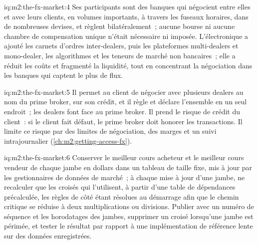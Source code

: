 \begin{solution}{iq:m2:the-fx-market:4}
Ses participants sont des banques qui négocient entre elles et avec leurs clients, en
volumes importants, à travers les fuseaux horaires, dans de nombreuses devises, et règlent
bilatéralement~; aucune bourse ni aucune chambre de compensation unique n'était nécessaire ni imposée. L'électronique
a ajouté les carnets d'ordres inter-dealers, puis les plateformes multi-dealers et mono-dealer,
les algorithmes et les teneurs de marché non bancaires~; elle a réduit les coûts et fragmenté
la liquidité, tout en concentrant la négociation dans les banques qui captent le plus de flux.
\end{solution}

\begin{solution}{iq:m2:the-fx-market:5}
Il permet au client de négocier avec plusieurs dealers au nom du prime broker, sur son crédit,
et il règle et déclare l'ensemble en un seul endroit~; les dealers font face au
prime broker. Il prend le risque de crédit du client~: si le client fait défaut, le prime
broker doit honorer les transactions. Il limite ce risque par des limites de négociation, des marges
et un suivi intrajournalier (\cref{ch:m2:getting-access-fx}).
\end{solution}

\begin{solution}{iq:m2:the-fx-market:6}
Conserver le meilleur cours acheteur et le meilleur cours vendeur de chaque jambe en dollars dans un
tableau de taille fixe, mis à jour par les gestionnaires de données de marché~; à chaque mise à jour
d'une jambe, ne recalculer que les croisés qui l'utilisent, à partir d'une table de dépendances
précalculée, les règles de côté étant résolues au démarrage afin que le chemin critique
se réduise à deux multiplications ou divisions. Publier avec un numéro de séquence
et les horodatages des jambes, supprimer un croisé lorsqu'une jambe est périmée, et tester
le résultat par rapport à une implémentation de référence lente sur des données enregistrées.
\end{solution}
